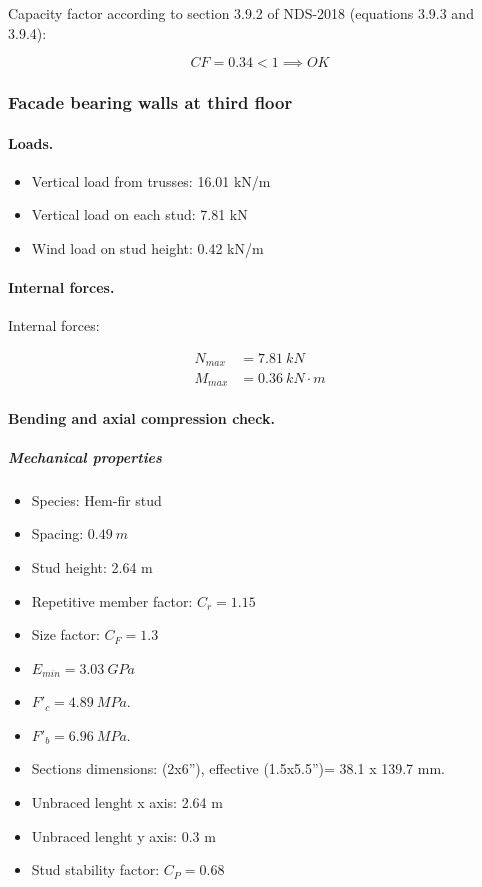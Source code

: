 \noindent Capacity factor according to section 3.9.2 of NDS-2018 (equations 3.9.3 and 3.9.4):

\begin{equation}
  CF= 0.34 < 1 \implies OK
\end{equation}

\subsubsection{Facade bearing walls at third floor}

\paragraph{Loads.}

\begin{itemize}
\item Vertical load from trusses: 16.01 kN/m
\item Vertical load on each stud: 7.81 kN
\item Wind load on stud height: 0.42 kN/m
\end{itemize}

\paragraph{Internal forces.}

\noindent Internal forces:

\begin{align}
  N_{max}&= 7.81\ kN \\
  M_{max}&= 0.36\ kN \cdot m
\end{align}

\paragraph{Bending and axial compression check.}

\subparagraph{Mechanical properties}

\begin{itemize}
\item Species: Hem-fir stud
\item Spacing: $0.49\ m$
\item Stud height: 2.64 m
\item Repetitive member factor: $C_r= 1.15$
\item Size factor: $C_F= 1.3$
\item $E_{min}= 3.03\ GPa$
\item $F'_c= 4.89\ MPa$.
\item $F'_b= 6.96\ MPa$.
\item Sections dimensions: (2x6''), effective (1.5x5.5'')= 38.1 x 139.7  mm.
\item Unbraced lenght x axis: 2.64 m
\item Unbraced lenght y axis: 0.3 m
\item Stud stability factor: $C_P= 0.68$
\end{itemize}

